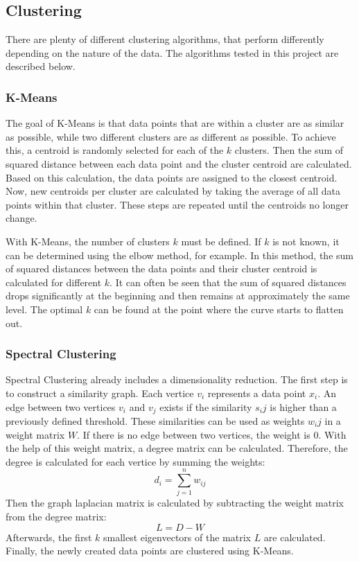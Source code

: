 \subsection{Clustering}
\label{clustering_methods}

There are plenty of different clustering algorithms, that perform differently depending on the nature of the data.
The algorithms tested in this project are described below.

\subsubsection{K-Means}
The goal of K-Means is that data points that are within a cluster are as similar as possible, while two different clusters are as different as possible.
To achieve this, a centroid is randomly selected for each of the $k$ clusters.
Then the sum of squared distance between each data point and the cluster centroid are calculated.
Based on this calculation, the data points are assigned to the closest centroid.
Now, new centroids per cluster are calculated by taking the average of all data points within that cluster.
These steps are repeated until the centroids no longer change.\cite{kmeans}

With K-Means, the number of clusters $k$ must be defined. If $k$ is not known, it can be determined using the elbow method, for example.
In this method, the sum of squared distances between the data points and their cluster centroid is calculated for different $k$.
It can often be seen that the sum of squared distances drops significantly at the beginning and then remains at approximately the same level.
The optimal $k$ can be found at the point where the curve starts to flatten out.\cite{kmeans}

\subsubsection{Spectral Clustering}
Spectral Clustering already includes a dimensionality reduction.
The first step is to construct a similarity graph.
Each vertice $v_i$ represents a data point $x_i$.
An edge between two vertices $v_i$ and $v_j$ exists if the similarity $s_ij$ is higher than a previously defined threshold.
These similarities can be used as weights $w_ij$ in a weight matrix $W$.
If there is no edge between two vertices, the weight is $0$.
With the help of this weight matrix, a degree matrix can be calculated.
Therefore, the degree is calculated for each vertice by summing the weights:
$$
d_i = \sum_{j=1}^n{w_{ij}}
$$
Then the graph laplacian matrix is calculated by subtracting the weight matrix from the degree matrix:
$$
L = D - W
$$
Afterwards, the first $k$ smallest eigenvectors of the matrix $L$ are calculated.
Finally, the newly created data points are clustered using K-Means.\cite{spectral_clustering}

